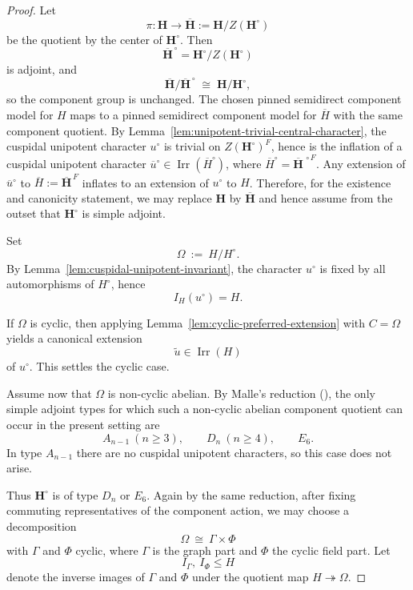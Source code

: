 \documentclass{amsart}
\theoremstyle{plain}
\numberwithin{equation}{section}
\theoremstyle{definition}
\newcommand{\Irr}{\operatorname{Irr}}
\begin{document}
\begin{proof}
Let
\[
\pi:\mathbf H \longrightarrow \overline{\mathbf H}:=\mathbf H/Z(\mathbf H^\circ)
\]
be the quotient by the center of \(\mathbf H^\circ\). Then
\[
\overline{\mathbf H}^{\,\circ}=\mathbf H^\circ/Z(\mathbf H^\circ)
\]
is adjoint, and
\[
\overline{\mathbf H}/\overline{\mathbf H}^{\,\circ}\;\cong\;\mathbf H/\mathbf H^\circ,
\]
so the component group is unchanged.  The chosen pinned semidirect component model for $H$
maps to a pinned semidirect component model for $\overline H$ with the same component quotient.
By Lemma~\ref{lem:unipotent-trivial-central-character},
the cuspidal unipotent character \(u^\circ\) is trivial on \(Z(\mathbf H^\circ)^F\), hence is the
inflation of a cuspidal unipotent character \(\overline u^\circ\in\Irr(\overline H^\circ)\), where
\(\overline H^\circ=\overline{\mathbf H}^{\,\circ F}\). Any extension of \(\overline u^\circ\) to
\(\overline H:=\overline{\mathbf H}^{\,F}\) inflates to an extension of \(u^\circ\) to \(H\).
Therefore, for the existence and canonicity statement, we may replace \(\mathbf H\) by
\(\overline{\mathbf H}\) and hence assume from the outset that \(\mathbf H^\circ\) is simple adjoint.

Set
\[
\Omega \ :=\ H/H^\circ .
\]
By Lemma~\ref{lem:cuspidal-unipotent-invariant}, the character \(u^\circ\) is fixed by all
automorphisms of \(H^\circ\), hence
\[
I_H(u^\circ)=H.
\]

If \(\Omega\) is cyclic, then applying
Lemma~\ref{lem:cyclic-preferred-extension} with \(C=\Omega\) yields a canonical
extension
\[
\widetilde u\in\Irr(H)
\]
of \(u^\circ\). This settles the cyclic case.

Assume now that \(\Omega\) is non-cyclic abelian. By Malle's reduction
(\cite[Prop.~2.2]{Malle08}), the only simple adjoint types for which such a non-cyclic abelian
component quotient can occur in the present setting are
\[
A_{n-1}\ (n\ge 3),\qquad D_n\ (n\ge 4),\qquad E_6.
\]
In type \(A_{n-1}\) there are no cuspidal unipotent characters, so this case does not arise.

Thus \(\mathbf H^\circ\) is of type \(D_n\) or \(E_6\). Again by the same reduction, after fixing
commuting representatives of the component action, we may choose a decomposition
\[
\Omega \ \cong\ \Gamma\times\Phi
\]
with \(\Gamma\) and \(\Phi\) cyclic, where \(\Gamma\) is the graph part and \(\Phi\) the cyclic
field part. Let
\[
I_\Gamma,\ I_\Phi \le H
\]
denote the inverse images of \(\Gamma\) and \(\Phi\) under the quotient map \(H\twoheadrightarrow\Omega\).


\end{proof}
\end{document}
